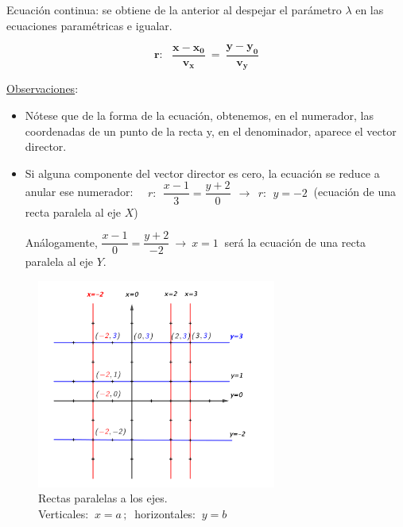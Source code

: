 \vspace{5mm}
\begin{definition}


Ecuación continua: se obtiene de la anterior al despejar el parámetro $\lambda$ en las ecuaciones paramétricas e igualar. 

$$\boxed{ \ \boldsymbol{ r:\  \ \ \dfrac{x-x_0}{v_x}  \ = \  \dfrac{y-y_0}{v_y} }\ }	$$
\end{definition}
\underline{Observaciones}:

\begin{itemize}
\item Nótese que de la forma de la ecuación, obtenemos, en el numerador, las coordenadas de un punto de la recta y, en el denominador, aparece el vector director.	
\item Si alguna componente del vector director es cero, la ecuación se reduce a anular ese numerador: $\quad r:\ \ \dfrac{x-1}{3}=\dfrac{y+2}{0} \ \ \to \ \ r:\ \ y=-2\ $ (ecuación de una recta paralela al eje $X$) $\ \ $ \begin{small} \textcolor{gris}{Análogamente, $\dfrac{x-1}{0}=\dfrac{y+2}{-2} \ \to \  x=1 \ $ será la ecuación de una recta paralela al eje $Y$.} \end{small}
\end{itemize}

\begin{figure}[H]
	\centering
	\includegraphics[width=0.7\textwidth]{img-ga/ga15b.png}
	\caption*{Rectas paralelas a los ejes. \\ Verticales: $\ x=a\, ; \ $ horizontales: $\ y=b$}
\end{figure}

